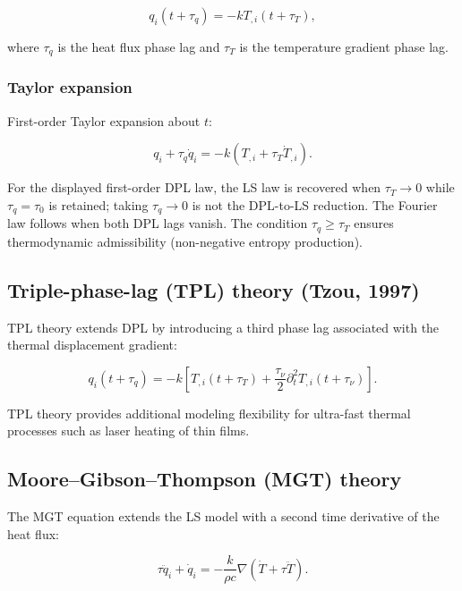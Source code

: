 \begin{equation}
q_i(t + \tau_q) = -k T_{,i}(t + \tau_T),
\label{eq:4.15}
\end{equation}

where $\tau_q$ is the heat flux phase lag and $\tau_T$ is the temperature gradient phase lag.

\subsubsection{Taylor expansion}

First-order Taylor expansion about $t$:

\begin{equation}
q_i + \tau_q\dot{q}_i = -k(T_{,i} + \tau_T\dot{T}_{,i}).
\label{eq:4.16}
\end{equation}

For the displayed first-order DPL law, the LS law is recovered when $\tau_T \to 0$ while $\tau_q=\tau_0$ is retained; taking $\tau_q \to 0$ is not the DPL-to-LS reduction. The Fourier law follows when both DPL lags vanish. The condition $\tau_q \geq \tau_T$ ensures thermodynamic admissibility (non-negative entropy production).

\subsection{Triple-phase-lag (TPL) theory (Tzou, 1997)}
\label{sec:4.8}

TPL theory extends DPL by introducing a third phase lag associated with the thermal displacement gradient:

\begin{equation}
q_i(t + \tau_q) = -k\left[T_{,i}(t + \tau_T) + \frac{\tau_\nu}{2}\partial_t^2 T_{,i}(t + \tau_\nu)\right].
\label{eq:4.17}
\end{equation}

TPL theory provides additional modeling flexibility for ultra-fast thermal processes such as laser heating of thin films.

\subsection{Moore--Gibson--Thompson (MGT) theory}
\label{sec:4.9}

The MGT equation extends the LS model with a second time derivative of the heat flux:

\begin{equation}
\tau\ddot{q}_i + \dot{q}_i = -\frac{k}{\rho c}\nabla(\dot{T} + \tau\ddot{T}).
\label{eq:4.18}
\end{equation}

